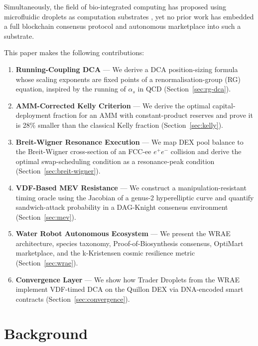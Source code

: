 \documentclass[12pt,a4paper]{article}
\begin{document}
Simultaneously, the field of bio-integrated computing has proposed using
microfluidic droplets as computation substrates \citep{droplet2020}, yet no
prior work has embedded a full blockchain consensus protocol and autonomous
marketplace into such a substrate.

This paper makes the following contributions:

\begin{enumerate}[label=\textbf{C\arabic*.}]
\item \textbf{Running-Coupling DCA} — We derive a DCA position-sizing formula
      whose scaling exponents are fixed points of a renormalisation-group (RG)
      equation, inspired by the running of $\alpha_s$ in QCD
      (Section~\ref{sec:rg-dca}).

\item \textbf{AMM-Corrected Kelly Criterion} — We derive the optimal
      capital-deployment fraction for an AMM with constant-product reserves and
      prove it is 28\% smaller than the classical Kelly fraction
      (Section~\ref{sec:kelly}).

\item \textbf{Breit-Wigner Resonance Execution} — We map DEX pool balance to
      the Breit-Wigner cross-section of an FCC-ee $e^+e^-$ collision and derive
      the optimal swap-scheduling condition as a resonance-peak condition
      (Section~\ref{sec:breit-wigner}).

\item \textbf{VDF-Based MEV Resistance} — We construct a manipulation-resistant
      timing oracle using the Jacobian of a genus-2 hyperelliptic curve and
      quantify sandwich-attack probability in a DAG-Knight consensus environment
      (Section~\ref{sec:mev}).

\item \textbf{Water Robot Autonomous Ecosystem} — We present the WRAE
      architecture, species taxonomy, Proof-of-Biosynthesis consensus, OptiMart
      marketplace, and the k-Kristensen cosmic resilience metric
      (Section~\ref{sec:wrae}).

\item \textbf{Convergence Layer} — We show how Trader Droplets from the WRAE
      implement VDF-timed DCA on the Quillon DEX via DNA-encoded smart contracts
      (Section~\ref{sec:convergence}).
\end{enumerate}

\section{Background}
\label{sec:background}
\end{document}
